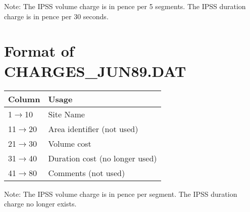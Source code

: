 Note: The IPSS volume charge is in pence per 5 segments.
      The IPSS duration charge is in pence per 30 seconds.


\section{Format of CHARGES\_\/JUN89.DAT }
\begin{table}[htb]
\begin{center}
\begin{tabular} {||l|l||}
\hline
Column   & Usage   \\
\hline
 1$\rightarrow$10        &          Site Name                     \\
11$\rightarrow$20        &          Area identifier (not used)    \\
21$\rightarrow$30        &          Volume cost                   \\
31$\rightarrow$40        &          Duration cost (no longer used)\\
41$\rightarrow$80        &          Comments (not used)           \\
\hline
\end{tabular}
\end{center}
\end{table}

\noindent Note: The IPSS volume charge is in pence per segment.
      The IPSS duration charge no longer exists.



